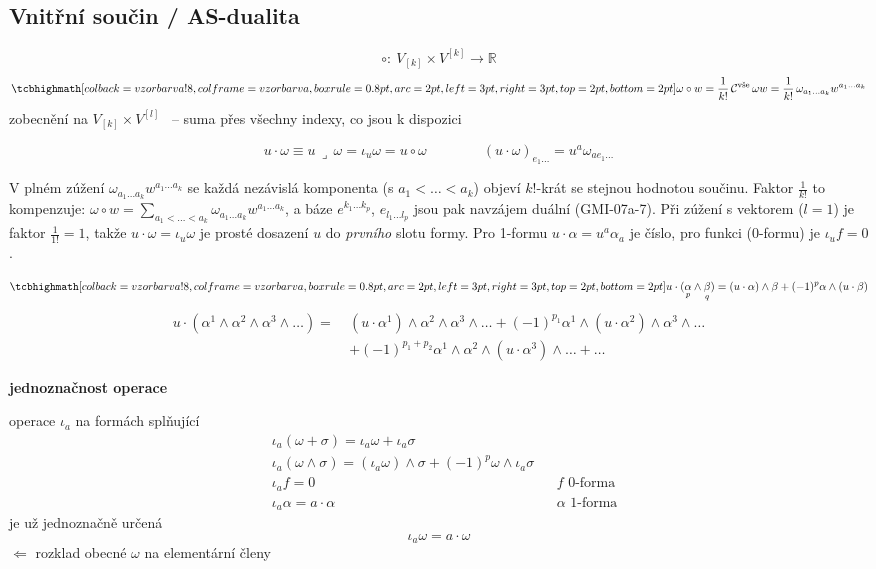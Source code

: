 \subsection{Vnitřní součin / AS-dualita}

\begin{definice}
\[
  \circ:\ V_{[k]}\times V^{[k]}\to\mathbb{R}
\]
\[
  \vzorec{\omega\circ w = \frac{1}{k!}\,\mathcal{C}^{\text{vše}}\,\omega w = \frac{1}{k!}\,\omega_{a_1\dots a_k}w^{a_1\dots a_k}}
\]
zobecnění na $V_{[k]}\times V^{[l]}$ \ -- suma přes všechny indexy, co jsou k dispozici
\end{definice}

\[
  u\cdot\omega \equiv u\,\lrcorner\,\omega = \iota_u\omega = u\circ\omega
  \qquad\qquad (u\cdot\omega)_{e_1\dots} = u^a\omega_{ae_1\dots}
\]

\begin{vysvetleni}
V plném zúžení $\omega_{a_1\dots a_k}w^{a_1\dots a_k}$ se každá nezávislá komponenta (s $a_1<\dots<a_k$) objeví $k!$-krát se stejnou hodnotou součinu. Faktor $\frac1{k!}$ to kompenzuje: $\omega\circ w=\sum_{a_1<\dots<a_k}\omega_{a_1\dots a_k}w^{a_1\dots a_k}$, a báze $e^{k_1\dots k_p}$, $e_{l_1\dots l_p}$ jsou pak navzájem duální (GMI-07a-7).
Při zúžení s vektorem ($l=1$) je faktor $\frac1{1!}=1$, takže $u\cdot\omega=\iota_u\omega$ je prosté dosazení $u$ do \emph{prvního} slotu formy. Pro 1-formu $u\cdot\alpha=u^a\alpha_a$ je číslo, pro funkci (0-formu) je $\iota_uf=0$.
\end{vysvetleni}

\begin{veta}
\[
  \vzorec{u\cdot(\underset{p}{\alpha}\wedge\underset{q}{\beta}) = (u\cdot\alpha)\wedge\beta + (-1)^p\alpha\wedge(u\cdot\beta)}
\]
\begin{align*}
  u\cdot(\alpha^1\wedge\alpha^2\wedge\alpha^3\wedge\dots) = \ &(u\cdot\alpha^1)\wedge\alpha^2\wedge\alpha^3\wedge\dots
    + (-1)^{p_1}\alpha^1\wedge(u\cdot\alpha^2)\wedge\alpha^3\wedge\dots \\
  &+ (-1)^{p_1+p_2}\alpha^1\wedge\alpha^2\wedge(u\cdot\alpha^3)\wedge\dots + \dots
\end{align*}
\end{veta}

\textbf{jednoznačnost operace}

\begin{veta}[Tvrzení]
operace $\iota_a$ na formách splňující
\begin{align*}
  &\iota_a(\omega + \sigma) = \iota_a\omega + \iota_a\sigma \\
  &\iota_a(\omega\wedge\sigma) = (\iota_a\omega)\wedge\sigma + (-1)^p\omega\wedge\iota_a\sigma \\
  &\iota_af = 0 && f \text{ 0-forma} \\
  &\iota_a\alpha = a\cdot\alpha && \alpha \text{ 1-forma}
\end{align*}
je už jednoznačně určená
\[
  \iota_a\omega = a\cdot\omega
\]
$\Leftarrow$ rozklad obecné $\omega$ na elementární členy
\end{veta}


